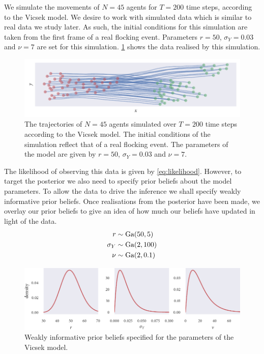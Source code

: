 We simulate the movements of $N=45$ agents for $T=200$ time steps, according to the Vicsek
model. We desire to work with simulated data which is similar to real data we
study later. As such, the initial conditions for this simulation are taken from the
first frame of a real flocking event. Parameters $r=50$, $\sigma_Y=0.03$ and $\nu=7$ are
set for this simulation. \cref{fig:vicsek_sim_study} shows the data realised by this
simulation.

\begin{figure}[tb]
    \includegraphics{vicsek_sim.pdf}
    \caption{The trajectories of $N=45$ agents simulated over $T=200$ time steps according to
    the Vicsek model. The initial conditions of the simulation reflect that of a real
flocking event. The parameters of the model are given by $r=50$, $\sigma_Y=0.03$ and
$\nu=7$.}
    \label{fig:vicsek_sim_study}
\end{figure}

The likelihood of observing this data is given by \cref{eq:likelihood}. However,
to target the posterior we also need to specify prior beliefs about the model parameters.
To allow the data to drive the inference we shall specify weakly informative prior
beliefs. Once realisations from the posterior have been made, we overlay our prior
beliefs to give an idea of how much our beliefs have updated in light of the data. 
\begin{align*}
    r           & \sim \textrm{Ga}(50, 5) \\
    \sigma_Y    & \sim \textrm{Ga}(2, 100)\\
    \nu         & \sim \textrm{Ga}(2, 0.1)
\end{align*}

\begin{figure}[tb]
    \includegraphics{priors.pdf}
    \caption{Weakly informative prior beliefs specified for the parameters of the Vicsek model.}
\end{figure}


